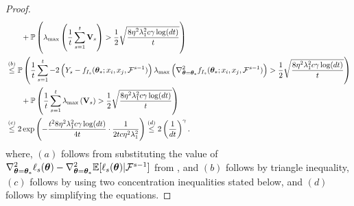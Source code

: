 \begin{proof}
\begin{align}
    &\qquad + \Pb\left( \lambda_{\max}\left(\frac{1}{t}\sum_{s=1}^t \mathbf{V}_s\right) > \frac{1}{2}\sqrt{\dfrac{8\eta^2\lambda^2_1c\gamma\log(dt)}{t}}\right)  \nonumber\\
    &\overset{(b)}{\leq} \Pb\left(\frac{1}{t}\sum_{s=1}^t-2\left(Y_s - f_{I_s}(\btheta_*; x_i, x_j, \F^{s-1})\right)\lambda_{\max}\left(\nabla^2_{\btheta=\btheta_*}f_{I_s}(\btheta_*; x_i, x_j, \F^{s-1})\right) > \frac{1}{2}\sqrt{\dfrac{8\eta^2\lambda^2_1c\gamma\log(dt)}{t}}\right)\nonumber\\
    &\qquad + \Pb\left( \frac{1}{t}\sum_{s=1}^t \lambda_{\max}\left(\mathbf{V}_s\right) > \frac{1}{2}\sqrt{\dfrac{8\eta^2\lambda^2_1c\gamma\log(dt)}{t}}\right)\nonumber\\%
    &\overset{(c)}{\leq} 2\exp\left(- \dfrac{t^2 8\eta^2\lambda_1^2c\gamma\log(dt)}{4t}\cdot\dfrac{1}{2tc\eta^2\lambda_1^2}\right) \overset{(d)}{\leq} 2\left(\dfrac{1}{dt}\right)^{\gamma}.
    \label{eq:regression-conc}
\end{align}
where, $(a)$ follows from substituting the value of $\nabla^2_{\bm{\theta}=\bm{\theta}_*} \ell_{s}(\bm{\theta}) - \nabla^2_{\bm{\theta}=\bm{\theta}_*} \mathbb{E}[\ell_{s}(\bm{\theta})|\mathcal{F}^{s-1}]$ from , and $(b)$ follows by triangle inequality, $(c)$ follows by using two concentration inequalities stated below, and $(d)$ follows by simplifying the equations. 



\end{proof}
